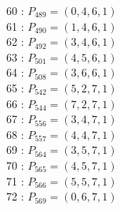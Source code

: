 \documentclass{article}
\begin{document}
{\begin{multicols}{3}
60 : $P_{489}=( 0, 4, 6, 1 )$\\
61 : $P_{490}=( 1, 4, 6, 1 )$\\
62 : $P_{492}=( 3, 4, 6, 1 )$\\
63 : $P_{501}=( 4, 5, 6, 1 )$\\
64 : $P_{508}=( 3, 6, 6, 1 )$\\
65 : $P_{542}=( 5, 2, 7, 1 )$\\
66 : $P_{544}=( 7, 2, 7, 1 )$\\
67 : $P_{556}=( 3, 4, 7, 1 )$\\
68 : $P_{557}=( 4, 4, 7, 1 )$\\
69 : $P_{564}=( 3, 5, 7, 1 )$\\
70 : $P_{565}=( 4, 5, 7, 1 )$\\
71 : $P_{566}=( 5, 5, 7, 1 )$\\
72 : $P_{569}=( 0, 6, 7, 1 )$\\
\end{multicols}


%


%


}%
\end{document}
